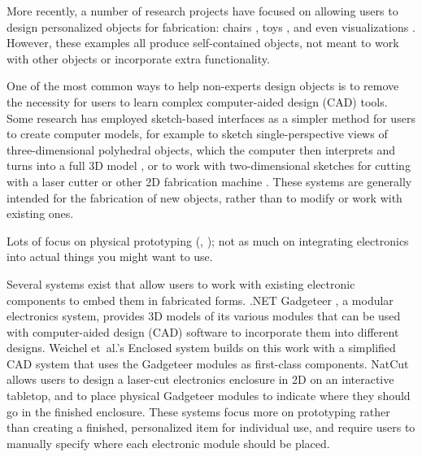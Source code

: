 \documentclass{chi-ext}
\begin{document}
	More recently, a number of research projects have focused on
	allowing users to design personalized objects for fabrication:
	chairs \cite{Saul:2011cy}, toys \cite{Blauvelt:2006ui, Zhu:2012wk},
	and even visualizations \cite{Khot:2014gm,Swaminathan:2014hu}.
	However, these examples all produce self-contained objects, not
	meant to work with other objects or incorporate extra functionality.

	One of the most common ways to help non-experts design objects is to
	remove the necessity for users to learn complex computer-aided
	design (CAD) tools.  Some research has employed sketch-based
	interfaces as a simpler method for users to create computer models,
	for example to sketch single-perspective views of three-dimensional
	polyhedral objects, which the computer then interprets and turns
	into a full 3D model \cite{Lau:2010ug, Masry:2005dp, OH:2006gf,
	Plumed:2013bu}, or to work with two-dimensional sketches for cutting
	with a laser cutter or other 2D fabrication machine
	\cite{Johnson:2012gu, Mori:2007ez, OH:2006gf, Saul:2011cy}. These
	systems are generally intended for the fabrication of new objects,
	rather than to modify or work with existing ones.

	Lots of focus on physical prototyping (\cite{Hodges:2013gh},
	\cite{Hartmann:2006p6051}); not as much on integrating electronics
	into actual things you might want to use.

	Several systems exist that allow users to work with existing
	electronic components to embed them in fabricated forms. .NET Gadgeteer
	\cite{Villar:2012hd}, a modular electronics system, provides 3D
	models of its various modules that can be used with computer-aided
	design (CAD) software to incorporate them into different designs.
	Weichel et~al.'s Enclosed system \cite{Weichel:2013kn} builds on
	this work with a simplified CAD system that uses the Gadgeteer
	modules as first-class components. NatCut \cite{Schneegass:2014ip}
	allows users to design a laser-cut electronics enclosure in 2D on an
	interactive tabletop, and to place physical Gadgeteer modules to
	indicate where they should go in the finished enclosure. These
	systems focus more on prototyping rather than creating a finished,
	personalized item for individual use, and require users to manually
	specify where each electronic module should be placed.
	
\end{document}
